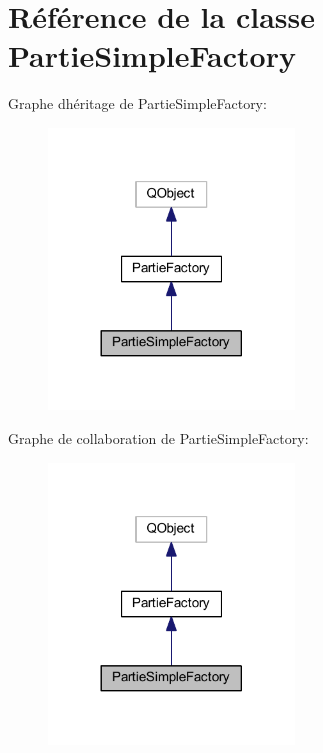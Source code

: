 \hypertarget{class_partie_simple_factory}{}\section{Référence de la classe Partie\+Simple\+Factory}
\label{class_partie_simple_factory}


Graphe d\textquotesingle{}héritage de Partie\+Simple\+Factory\+:
\nopagebreak
\begin{figure}[H]
\begin{center}
\leavevmode
\includegraphics[width=185pt]{class_partie_simple_factory__inherit__graph}
\end{center}
\end{figure}


Graphe de collaboration de Partie\+Simple\+Factory\+:
\nopagebreak
\begin{figure}[H]
\begin{center}
\leavevmode
\includegraphics[width=185pt]{class_partie_simple_factory__coll__graph}
\end{center}
\end{figure}
